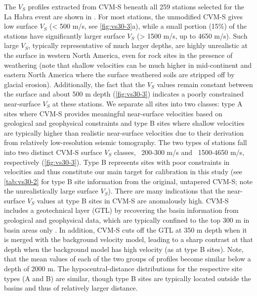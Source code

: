 The $V_S$ profiles extracted from CVM-S beneath all 259 stations selected for the La Habra event are shown in . For most stations, the unmodified CVM-S gives low surface $V_S$ (< 500 m/s, see \cref{fig:vs30-3}a), while a small portion (15\%) of the stations have significantly larger surface $V_S$ (> 1500 m/s, up to 4650 m/s). Such large $V_S$, typically representative of much larger depths, are highly unrealistic at the surface in western North America, even for rock sites in the presence of weathering (note that shallow velocities can be much higher in mid-continent and eastern North America where the surface weathered soils are stripped off by glacial erosion). Additionally, the fact that the $V_S$ values remain constant between the surface and about 500 m depth (\cref{fig:vs30-3}) indicates a poorly constrained near-surface $V_S$ at these stations. We separate all sites into two classes: type A sites where CVM-S provides meaningful near-surface velocities based on geological and geophysical constraints and type B sites where shallow velocities are typically higher than realistic near-surface velocities due to their derivation from relatively low-resolution seismic tomography. The two types of stations fall into two distinct CVM-S surface $V_S$ classes, ~200-300 m/s and ~1500-4650 m/s, respectively (\cref{fig:vs30-3}). Type B represents sites with poor constraints in velocities and thus constitute our main target for calibration in this study (see \cref{tab:vs30-2} for type B site information from the original, untapered CVM-S; note the unrealistically large surface $V_S$). There are many indications that the near-surface $V_S$ values at type B sites in CVM-S are anomalously high. CVM-S includes a geotechnical layer (GTL) by recovering the basin information from geological and geophysical data, which are typically confined to the top 300 m in basin areas only \citep{magistraleGeologybased3DVelocity1996,magistraleSCECSouthernCalifornia2000}. In addition, CVM-S cuts off the GTL at 350 m depth when it is merged with the background velocity model, leading to a sharp contrast at that depth when the background model has high velocity (as at type B sites). Note, that the mean values of each of the two groups of profiles become similar below a depth of 2000 m. The hypocentral-distance distributions for the respective site types (A and B) are similar, though type B sites are typically located outside the basins and thus of relatively larger distance.

